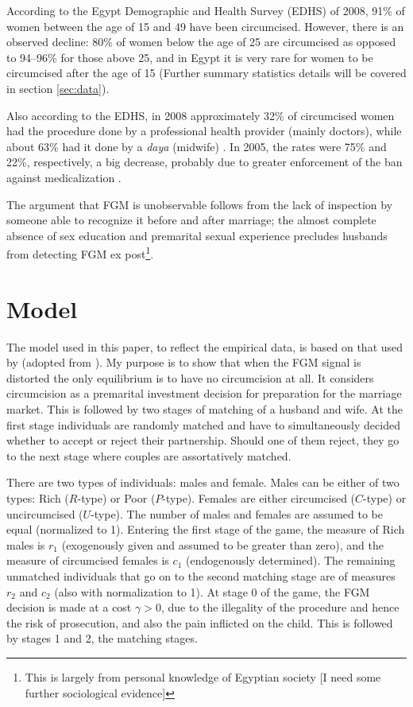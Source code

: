 \documentclass[12pt]{article}
\begin{document}
According to the Egypt Demographic and Health Survey (EDHS) of 2008, 91\% of women between the age of 15 and 49 have been circumcised.  However, there is an observed decline: 80\% of women below the age of 25 are circumcised as opposed to 94--96\% for those above 25, and in Egypt it is very rare for women to be circumcised after the age of 15 \citep{El-Zanat, El-Gibaly2002} (Further summary statistics details will be covered in section \ref{sec:data}).  

Also according to the EDHS, in 2008 approximately 32\% of circumcised women had the procedure done by a professional health provider (mainly doctors), while about 63\% had it done by a \emph{daya} (midwife) \citep{El-Zanat}. In 2005, the rates were 75\% and 22\%, respectively, a big decrease, probably due to greater enforcement of the ban against medicalization \citep{El-Zanaty2006}.  

The argument that FGM is unobservable follows from the lack of inspection by someone able to recognize it before and after marriage; the almost complete absence of sex education and premarital sexual experience precludes husbands from detecting FGM ex post\footnote{This is largely from personal knowledge of Egyptian society [I need some further sociological evidence]}.

\section{Model}

The model used in this paper, to reflect the empirical data, is based on that used by \citet{Chesnokova2007} (adopted from \citet{Fernandez2005}).  My purpose is to show that when the FGM signal is distorted the only equilibrium is to have no circumcision at all.  It considers circumcision as a premarital investment decision for preparation for the marriage market.  This is followed by two stages of matching of a husband and wife.  At the first stage individuals are randomly matched and have to simultaneously decided whether to accept or reject their partnership.  Should one of them reject, they go to the next stage where couples are assortatively matched.

There are two types of individuals: males and female.  Males can be either of two types: Rich ($R$-type) or Poor ($P$-type).  Females are either circumcised ($C$-type) or uncircumcised ($U$-type). The number of males and females are assumed to be equal (normalized to 1).  Entering the first stage of the game, the measure of Rich males is $r_1$ (exogenously given and assumed to be greater than zero), and the measure of circumcised females is  $c_1$ (endogenously determined). The remaining unmatched individuals that go on to the second matching stage are of measures $r_2$ and $c_2$ (also with normalization to 1). At stage 0 of the game, the FGM decision is made at a cost $\gamma > 0$, due to the illegality of the procedure and hence the risk of prosecution, and also the pain inflicted on the child. This is followed by stages 1 and 2, the matching stages.
\end{document}
